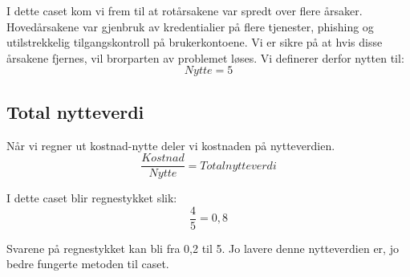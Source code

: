 I dette caset kom vi frem til at rotårsakene var spredt over flere årsaker. Hovedårsakene var gjenbruk av kredentialier på flere tjenester, phishing og utilstrekkelig tilgangskontroll på brukerkontoene. Vi er sikre på at hvis disse årsakene fjernes, vil brorparten av problemet løses. Vi definerer derfor nytten til:
\[Nytte = 5\]

\subsection{Total nytteverdi}
Når vi regner ut kostnad-nytte deler vi kostnaden på nytteverdien. 
\[\frac{Kostnad}{Nytte} = Total nytteverdi\]

I dette caset blir regnestykket slik:
\[\frac{4}{5} = 0,8\]

Svarene på regnestykket kan bli fra 0,2 til 5. Jo lavere denne nytteverdien er, jo bedre fungerte metoden til caset. 